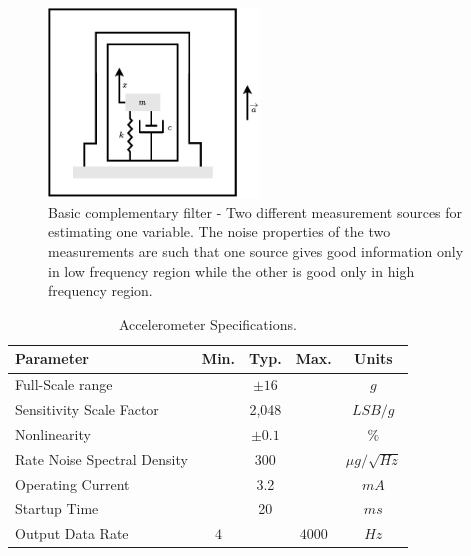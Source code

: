 \begin{figure}[!h]
    \centering
    \includegraphics[width=0.5\textwidth]{figures/accelerometer.pdf}
    \caption{Basic complementary filter \cite{higgins1975comparison} - Two different measurement sources for estimating one variable. The noise properties of the two measurements are such that one source gives good information only in low frequency region while the other is good only in high frequency region. }
    \label{fig:accelerometer_schematic}
\end{figure}

\begin{table}[H]
    \begin{center}
        \begin{tabular}[t]{lcccc}
            \hline
            Parameter                   & Min. & Typ.      & Max.   & Units             \\
            \hline
            Full-Scale range            &      & $\pm 16$  &        & $g$               \\
            Sensitivity Scale Factor    &      & 2,048     &        & $LSB/g$           \\
            Nonlinearity                &      & $\pm 0.1$ &        & $\%$              \\
            Rate Noise Spectral Density &      & 300       &        & $\mu g/\sqrt{Hz}$ \\
            Operating Current           &      & 3.2       &        & $mA$              \\
            Startup Time                &      & 20        &        & $ms$              \\
            Output Data Rate            & $4$  &           & $4000$ & $Hz$              \\
            \hline
        \end{tabular}
        \caption{Accelerometer Specifications. }
        \label{tab:accelerometer_specification}
    \end{center}
\end{table}

